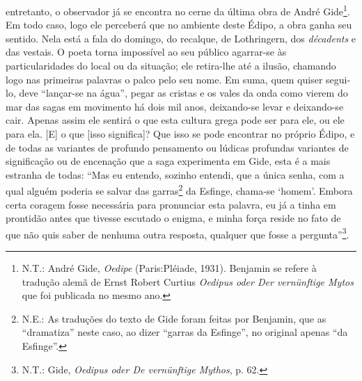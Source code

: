 entretanto, o observador já se encontra no cerne da última obra de André
Gide\footnote{N.T.: André Gide, \emph{Oedipe} (Paris:Pléiade, 1931).
  Benjamin se refere à tradução alemã de Ernst Robert Curtius
  \emph{Oedipus oder Der vernünftige Mytos} que foi publicada no mesmo
  ano.}. Em todo caso, logo ele perceberá que no ambiente deste Édipo, a
obra ganha seu sentido. Nela está a fala do domingo, do recalque, de
Lothringern, dos \emph{décadents} e das vestais. O poeta torna
impossível ao seu público agarrar-se às particularidades do local ou da
situação; ele retira-lhe até a ilusão, chamando logo nas primeiras
palavras o palco pelo seu nome. Em suma, quem quiser segui-lo, deve
``lançar-se na água'', pegar as cristas e os vales da onda como vierem
do mar das sagas em movimento há dois mil anos, deixando-se levar e
deixando-se cair. Apenas assim ele sentirá o que esta cultura grega pode
ser para ele, ou ele para ela. {[}E{]} o que {[}isso significa{]}? Que
isso se pode encontrar no próprio Édipo, e de todas as variantes de
profundo pensamento ou lúdicas profundas variantes de significação ou de
encenação que a saga experimenta em Gide, esta é a mais estranha de
todas: ``Mas eu entendo, sozinho entendi, que a única senha, com a qual
alguém poderia se salvar das garras\footnote{N.E.: As traduções do texto
  de Gide foram feitas por Benjamin, que as ``dramatiza'' neste caso, ao
  dizer ``garras da Esfinge'', no original apenas ``da Esfinge''.} da
Esfinge, chama-se `homem'. Embora certa coragem fosse necessária para
pronunciar esta palavra, eu já a tinha em prontidão antes que tivesse
escutado o enigma, e minha força reside no fato de que não quis saber de
nenhuma outra resposta, qualquer que fosse a pergunta''\footnote{N.T.:
  Gide, \emph{Oedipus oder De vernünftige Mythos}, p. 62.}.

